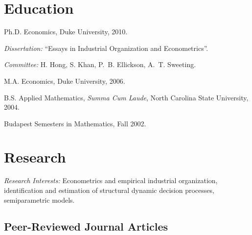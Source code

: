 \documentclass[10pt,letterpaper]{article}
\renewenvironment{itemize}{
  \begin{list}{}{
    \setlength{\leftmargin}{1.5em}
    \setlength{\itemsep}{0.25em}
    \setlength{\parskip}{0pt}
    \setlength{\parsep}{0.25em}
  }
}{
  \end{list}
}
\begin{document}
\section*{Education}

\begin{itemize}
  \item Ph.D. Economics, Duke University, 2010.
    \begin{itemize}
    \item \emph{Dissertation:} ``Essays in Industrial Organization and Econometrics''.
    \item \emph{Committee:} H. Hong, S. Khan, P.~B. Ellickson, A.~T. Sweeting.
    \end{itemize}
  \item M.A. Economics, Duke University, 2006.
  \item B.S. Applied Mathematics, \textit{Summa Cum Laude},
    North Carolina State University, 2004.
  \item Budapest Semesters in Mathematics, Fall 2002.
\end{itemize}

\section*{Research}

\textit{Research Interests:} Econometrics and empirical industrial organization, identification and estimation of structural dynamic decision processes, semiparametric models.

\subsection*{Peer-Reviewed Journal Articles}
\end{document}
